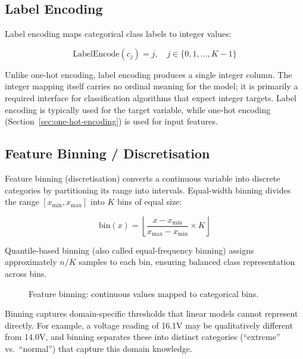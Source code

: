 \documentclass[10pt,a4paper]{article}
\begin{document}
\subsection{Label Encoding}
\label{sec:label-encoding}

Label encoding maps categorical class labels to integer values:

\begin{equation}
\text{LabelEncode}(c_j) = j, \quad j \in \{0, 1, \ldots, K-1\}
\label{eq:label-encode}
\end{equation}

Unlike one-hot encoding, label encoding produces a single integer column. The integer mapping itself carries no ordinal meaning for the model; it is primarily a required interface for classification algorithms that expect integer targets. Label encoding is typically used for the target variable, while one-hot encoding (Section~\ref{sec:one-hot-encoding}) is used for input features.

\subsection{Feature Binning / Discretisation}
\label{sec:feature-binning}

Feature binning (discretisation) converts a continuous variable into discrete categories by partitioning its range into intervals. Equal-width binning divides the range $\left[x_{\min}, x_{\max}\right]$ into $K$ bins of equal size:

\begin{equation}
\text{bin}(x) = \left\lfloor \frac{x - x_{\min}}{x_{\max} - x_{\min}} \times K \right\rfloor
\label{eq:binning}
\end{equation}

Quantile-based binning (also called equal-frequency binning) assigns approximately $n/K$ samples to each bin, ensuring balanced class representation across bins.

\begin{figure}[H]
    \centering
    \caption{Feature binning: continuous values mapped to categorical bins.}
    \label{fig:feature-binning}
\end{figure}

Binning captures domain-specific thresholds that linear models cannot represent directly. For example, a voltage reading of 16.1V may be qualitatively different from 14.0V, and binning separates these into distinct categories (``extreme'' vs.\ ``normal'') that capture this domain knowledge.
\end{document}
